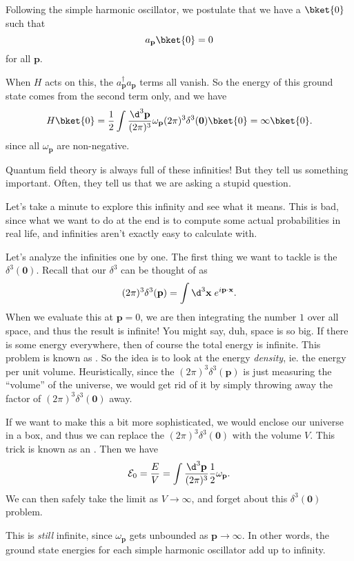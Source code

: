 \documentclass[a4paper]{article}
\begin{document}
Following the simple harmonic oscillator, we postulate that we have a  $\bket{0}$ such that
\[
  a_\mathbf{p} \bket{0} = 0
\]
for all $\mathbf{p}$.

When $H$ acts on this, the $a_\mathbf{p}^\dagger a_\mathbf{p}$ terms all vanish. So the energy of this ground state comes from the second term only, and we have
\[
  H\bket{0} = \frac{1}{2}\int \frac{\d^3 \mathbf{p}}{(2\pi)^3} \omega_\mathbf{p} (2\pi)^3 \delta^3(\mathbf{0}) \bket{0} = \infty\bket{0}.
\]
since all $\omega_\mathbf{p}$ are non-negative.

Quantum field theory is always full of these infinities! But they tell us something important. Often, they tell us that we are asking a stupid question.

Let's take a minute to explore this infinity and see what it means. This is bad, since what we want to do at the end is to compute some actual probabilities in real life, and infinities aren't exactly easy to calculate with.

Let's analyze the infinities one by one. The first thing we want to tackle is the $\delta^3(\mathbf{0})$. Recall that our $\delta^3$ can be thought of as
\[
  (2\pi)^3 \delta^3(\mathbf{p}) = \int \d^3 \mathbf{x}\; e^{i\mathbf{p}\cdot \mathbf{x}}.
\]
When we evaluate this at $\mathbf{p} = 0$, we are then integrating the number $1$ over all space, and thus the result is infinite! You might say, duh, space is so big. If there is some energy everywhere, then of course the total energy is infinite. This problem is known as . So the idea is to look at the energy \emph{density}, ie. the energy per unit volume. Heuristically, since the $(2\pi)^3\delta^3(\mathbf{p})$ is just measuring the ``volume'' of the universe, we would get rid of it by simply throwing away the factor of $(2\pi)^3 \delta^3(\mathbf{0})$ away.

If we want to make this a bit more sophisticated, we would enclose our universe in a box, and thus we can replace the $(2\pi)^3\delta^3(\mathbf{0})$ with the volume $V$. This trick is known as an . Then we have
\[
  \mathcal{E}_0 = \frac{E}{V} = \int \frac{\d^3 \mathbf{p}}{(2\pi)^3} \frac{1}{2} \omega_\mathbf{p}.
\]
We can then safely take the limit as $V \to \infty$, and forget about this $\delta^3(\mathbf{0})$ problem.

This is \emph{still} infinite, since $\omega_\mathbf{p}$ gets unbounded as $\mathbf{p} \to \infty$. In other words, the ground state energies for each simple harmonic oscillator add up to infinity.
\end{document}
